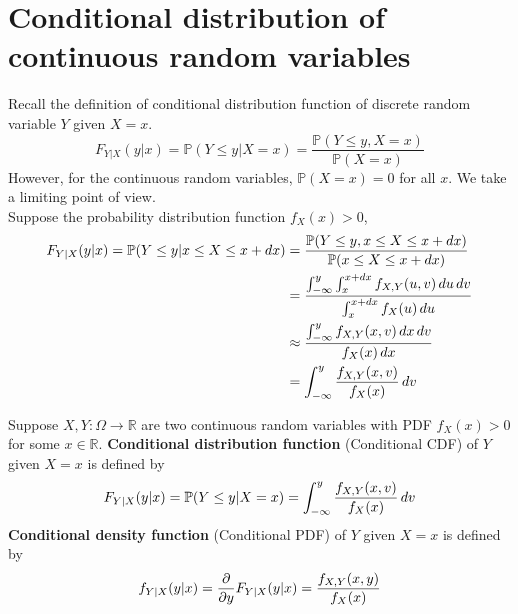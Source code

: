 \documentclass{huhtakm-template-book}
\newcommand{\prob}{\mathbb{P}}
\begin{document}
\section{Conditional distribution of continuous random variables}
Recall the definition of conditional distribution function of discrete random variable $Y$ given $X=x$.
\begin{equation*}
	F_{Y|X}(y|x)=\prob(Y\leq y|X=x)=\frac{\prob(Y\leq y,X=x)}{\prob(X=x)}
\end{equation*}
However, for the continuous random variables, $\prob(X=x)=0$ for all $x$. We take a limiting point of view.\\
Suppose the probability distribution function $f_{X}(x)>0$,
\begin{align*}
	F_{Y|X}(y|x)=\prob(Y\leq y|x\leq X\leq x+dx)&=\frac{\prob(Y\leq y,x\leq X\leq x+dx)}{\prob(x\leq X\leq x+dx)}\\
	&=\frac{\intlu{-\infty}{y}\intlu{x}{x+dx}f_{X,Y}(u,v)\,du\,dv}{\intlu{x}{x+dx}f_{X}(u)\,du}\\
	&\approx\frac{\intlu{-\infty}{y}f_{X,Y}(x,v)\,dx\,dv}{f_{X}(x)\,dx}\\
	&=\intlu{-\infty}{y}\frac{f_{X,Y}(x,v)}{f_{X}(x)}\,dv
\end{align*}
\begin{defn}
	Suppose $X,Y:\Omega\to\mathbb{R}$ are two continuous random variables with PDF $f_{X}(x)>0$ for some 
	$x\in\mathbb{R}$. \textbf{Conditional distribution function} (Conditional CDF) of $Y$ given $X=x$ is defined by
	\begin{equation*}
		F_{Y|X}(y|x)=\prob(Y\leq y|X=x)=\intlu{-\infty}{y}\frac{f_{X,Y}(x,v)}{f_{X}(x)}\,dv
	\end{equation*}
	\textbf{Conditional density function} (Conditional PDF) of $Y$ given $X=x$ is defined by
	\begin{equation*}
		f_{Y|X}(y|x)=\pdv*{F_{Y|X}(y|x)}{y}=\frac{f_{X,Y}(x,y)}{f_{X}(x)}
	\end{equation*}
\end{defn}
\end{document}

